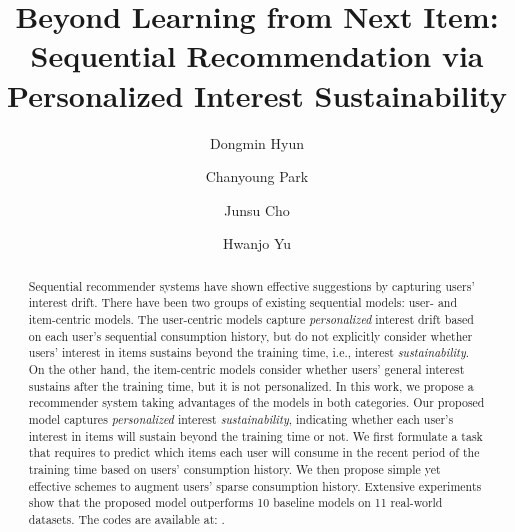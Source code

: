 \documentclass[sigconf]{acmart}
\begin{document}
\title{Beyond Learning from Next Item: Sequential Recommendation via Personalized Interest Sustainability}




\author{Dongmin Hyun}

\author{Chanyoung Park}

\author{Junsu Cho}

\author{Hwanjo Yu}


\renewcommand{\shortauthors}{Dongmin Hyun, Chanyoung Park, Junsu Cho, and Hwanjo Yu}



\begin{abstract} 
Sequential recommender systems have shown effective suggestions by capturing users' interest drift. 
There have been two groups of existing sequential models: user- and item-centric models.
The user-centric models capture \textit{personalized} interest drift based on each user's sequential consumption history, but do not explicitly consider whether users’ interest in items sustains beyond the training time, i.e., interest \textit{sustainability}. On the other hand, the item-centric models consider whether users’ general interest sustains after the training time,
but it is not personalized. 
In this work, we propose a recommender system taking advantages of the models in both categories. Our proposed model captures \textit{personalized} interest \textit{sustainability}, indicating whether each user’s interest in items will sustain beyond the training time or not. 
We first formulate a task that requires to predict which items each user will consume in the recent period of the training time based on users' consumption history.
We then propose simple yet effective schemes to augment users' sparse consumption history. 
Extensive experiments show that the proposed model outperforms 10 baseline models on 11 real-world datasets. The codes are available at: \href{https://github.com/dmhyun/PERIS}{\color{magenta}{https://github.com/dmhyun/PERIS}}.
\end{abstract}
\end{document}
